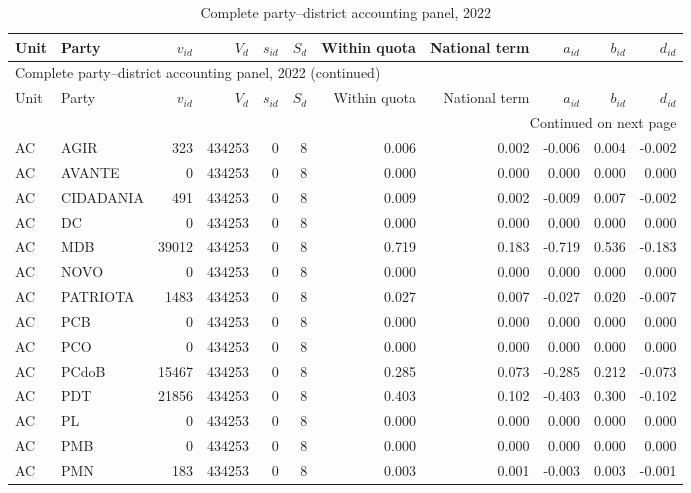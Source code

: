 \begin{landscape}
\begingroup
\tiny
\setlength{\tabcolsep}{3.2pt}
\begin{longtable}{llrrrrrrrrr}
\caption{Complete party--district accounting panel, 2022}\label{tab:intermediate-party-district-2022} \\
\toprule
Unit & Party & \(v_{id}\) & \(V_d\) & \(s_{id}\) & \(S_d\) & Within quota & National term & \(a_{id}\) & \(b_{id}\) & \(d_{id}\) \\
\midrule
\endfirsthead
\multicolumn{11}{l}{\footnotesize Complete party--district accounting panel, 2022 (continued)} \\
\toprule
Unit & Party & \(v_{id}\) & \(V_d\) & \(s_{id}\) & \(S_d\) & Within quota & National term & \(a_{id}\) & \(b_{id}\) & \(d_{id}\) \\
\midrule
\endhead
\midrule
\multicolumn{11}{r}{\footnotesize Continued on next page} \\
\endfoot
\bottomrule
\endlastfoot
AC & AGIR & 323 & 434253 & 0 & 8 & 0.006 & 0.002 & -0.006 & 0.004 & -0.002 \\
AC & AVANTE & 0 & 434253 & 0 & 8 & 0.000 & 0.000 & 0.000 & 0.000 & 0.000 \\
AC & CIDADANIA & 491 & 434253 & 0 & 8 & 0.009 & 0.002 & -0.009 & 0.007 & -0.002 \\
AC & DC & 0 & 434253 & 0 & 8 & 0.000 & 0.000 & 0.000 & 0.000 & 0.000 \\
AC & MDB & 39012 & 434253 & 0 & 8 & 0.719 & 0.183 & -0.719 & 0.536 & -0.183 \\
AC & NOVO & 0 & 434253 & 0 & 8 & 0.000 & 0.000 & 0.000 & 0.000 & 0.000 \\
AC & PATRIOTA & 1483 & 434253 & 0 & 8 & 0.027 & 0.007 & -0.027 & 0.020 & -0.007 \\
AC & PCB & 0 & 434253 & 0 & 8 & 0.000 & 0.000 & 0.000 & 0.000 & 0.000 \\
AC & PCO & 0 & 434253 & 0 & 8 & 0.000 & 0.000 & 0.000 & 0.000 & 0.000 \\
AC & PCdoB & 15467 & 434253 & 0 & 8 & 0.285 & 0.073 & -0.285 & 0.212 & -0.073 \\
AC & PDT & 21856 & 434253 & 0 & 8 & 0.403 & 0.102 & -0.403 & 0.300 & -0.102 \\
AC & PL & 0 & 434253 & 0 & 8 & 0.000 & 0.000 & 0.000 & 0.000 & 0.000 \\
AC & PMB & 0 & 434253 & 0 & 8 & 0.000 & 0.000 & 0.000 & 0.000 & 0.000 \\
AC & PMN & 183 & 434253 & 0 & 8 & 0.003 & 0.001 & -0.003 & 0.003 & -0.001 \\

\end{longtable}
\end{landscape}
